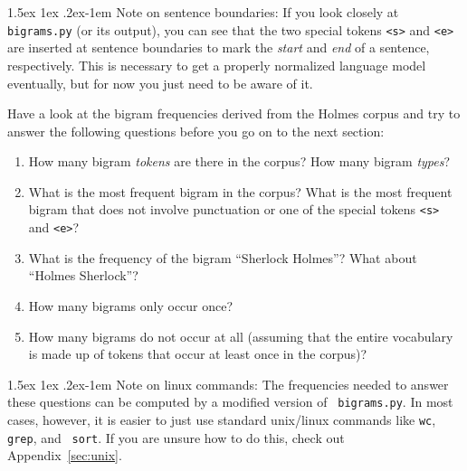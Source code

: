 \documentclass[11pt]{article}
\makeatletter
\renewcommand{\paragraph}{%
  \@startsection{paragraph}{4}%
  {\z@}{1.5ex \@plus 1ex \@minus .2ex}{-1em}%
  {\normalfont\normalsize\bfseries}%
}\makeatother
\makeatother
\begin{document}

\paragraph{Note on sentence boundaries:} If you look closely at {\tt
  bigrams.py} (or its output), you can see that the two special tokens
{\tt <s>} and {\tt <e>} are inserted at sentence boundaries to mark
the {\em start} and {\em end} of a sentence, respectively. This is
necessary to get a properly normalized language model eventually, but
for now you just need to be aware of it.

\vspace{0.3cm}
\noindent
Have a look at the bigram frequencies derived from the Holmes corpus
and try to answer the following questions before you go on to the next
section:
\begin{enumerate}
\item  How many bigram {\em tokens} are there in the corpus? %
How many bigram {\em types}? %
\item  What is the most frequent bigram in the corpus? %
What is the most frequent bigram that does not involve punctuation or one of the special tokens {\tt <s>} and {\tt <e>}? %
\item  What is the frequency of the bigram ``Sherlock Holmes''? %
What about ``Holmes Sherlock''? %
\item  How many bigrams only occur once? %
\item  How many bigrams do not occur at all (assuming that the entire vocabulary is made up of tokens that occur at least once in the corpus)?
\end{enumerate}

\paragraph{Note on linux commands:} The frequencies needed to answer
these questions can be computed by a modified version of {\tt
  bigrams.py}. In most cases, however, it is easier to just use
standard unix/linux commands like {\tt wc}, {\tt grep}, and {\tt
  sort}.  If you are unsure how to do this, check out
Appendix~\ref{sec:unix}.
\end{document}
